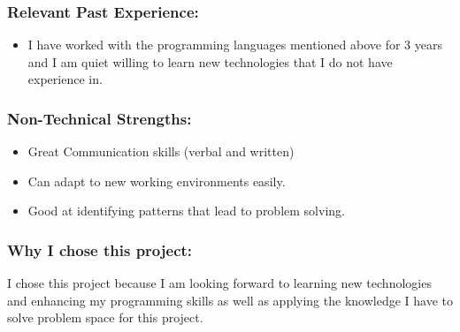 \subsubsection{Relevant Past Experience:}
\begin{itemize}
		\item I have worked with the programming languages mentioned above for 3 years and I am quiet willing to learn new technologies that I do not have experience in.
\end{itemize}
\subsubsection{Non-Technical Strengths:}
\begin{itemize}
		\item Great Communication skills (verbal and written)
		\item Can adapt to new working environments easily.
		\item Good at identifying patterns that lead to problem solving.
\end{itemize}
\subsubsection{Why I chose this project:}
\par{I chose this project because I am looking forward to learning new technologies and enhancing my programming skills as well as applying the knowledge I have to solve problem space for this project.}
\newpage